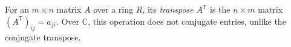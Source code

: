 
For an $m\times n$ matrix $A$ over a ring $R$, its \emph{transpose} $A^{\mathsf T}$ is the $n\times m$ matrix $(A^{\mathsf T})_{ij}=a_{ji}$. Over $\mathbb C$, this operation does not conjugate entries, unlike the conjugate transpose.
